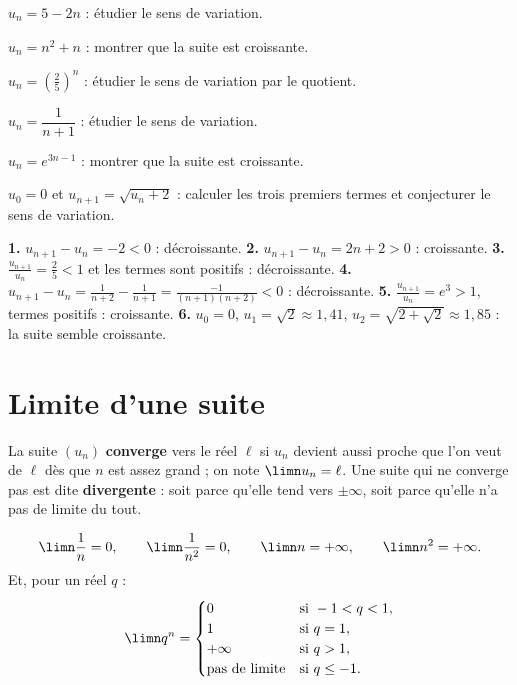 \begin{entrainement}
\exo[\niveau{1}] $u_{n} = 5-2n$ : étudier le sens de variation.

\exo[\niveau{2}] $u_{n} = n^{2}+n$ : montrer que la suite est croissante.

\exo[\niveau{2}] $u_{n} = \left(\frac25\right)^{n}$ : étudier le sens de
variation par le quotient.

\exo[\niveau{2}] $u_{n} = \dfrac{1}{n+1}$ : étudier le sens de variation.

\exo[\niveau{3}] $u_{n} = e^{3n-1}$ : montrer que la suite est croissante.

\exo[\niveau{3}] $u_{0} = 0$ et $u_{n+1} = \sqrt{u_{n}+2}$ : calculer les
trois premiers termes et conjecturer le sens de variation.
\end{entrainement}

\begin{corrige}
\textbf{1.} $u_{n+1}-u_{n} = -2<0$ : décroissante.
\textbf{2.} $u_{n+1}-u_{n} = 2n+2>0$ : croissante.
\textbf{3.} $\frac{u_{n+1}}{u_{n}} = \frac25<1$ et les termes sont positifs :
décroissante.
\textbf{4.} $u_{n+1}-u_{n} = \frac{1}{n+2}-\frac{1}{n+1}
= \frac{-1}{(n+1)(n+2)}<0$ : décroissante.
\textbf{5.} $\frac{u_{n+1}}{u_{n}} = e^{3}>1$, termes positifs :
croissante.
\textbf{6.} $u_{0} = 0$, $u_{1} = \sqrt2 \approx 1{,}41$,
$u_{2} = \sqrt{2+\sqrt2} \approx 1{,}85$ : la suite semble croissante.
\end{corrige}

\section{Limite d'une suite}

\begin{definition}
La suite $\left(u_{n}\right)$ \textbf{converge} vers le réel $\ell$ si
$u_{n}$ devient aussi proche que l'on veut de $\ell$ dès que $n$ est assez
grand ; on note $\limn u_{n} = \ell$. Une suite qui ne converge pas est dite
\textbf{divergente} : soit parce qu'elle tend vers $\pm\infty$, soit parce
qu'elle n'a pas de limite du tout.
\end{definition}

\begin{propriete}
\[
  \limn \frac1n = 0, \qquad \limn \frac{1}{n^{2}} = 0, \qquad
  \limn n = +\infty, \qquad \limn n^{2} = +\infty .
\]
Et, pour un réel $q$ :
\[
  \limn q^{n} =
  \begin{cases}
    0 & \text{si } -1<q<1,\\
    1 & \text{si } q = 1,\\
    +\infty & \text{si } q>1,\\
    \text{pas de limite} & \text{si } q \leq -1 .
  \end{cases}
\]
\end{propriete}

